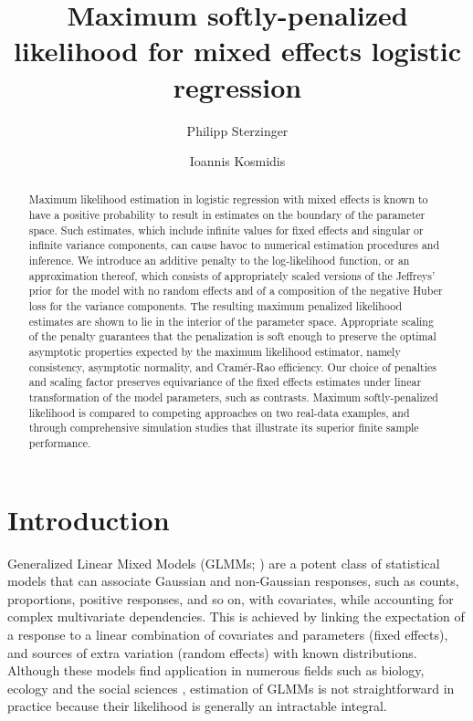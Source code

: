\documentclass[11pt, a4paper]{article}
\title{Maximum softly-penalized likelihood for mixed effects logistic regression}
\author[1]{Philipp Sterzinger}
\author[1,2]{Ioannis Kosmidis}
\affil[1]{Department of Statistics, University of Warwick, Coventry, CV4 7AL, UK}
\affil[2]{The Alan Turing Institute, London, NW1 2DB, UK}
\theoremstyle{example} \newtheorem{example}{Example}[section]
\theoremstyle{theorem} \newtheorem{theorem}{Theorem}[section]
\begin{document}
\maketitle

\begin{abstract}
Maximum likelihood estimation in logistic regression with mixed
effects is known to have a positive probability to result in
estimates on the boundary of the parameter space. Such estimates,
which include infinite values for fixed effects and singular or
infinite variance components, can cause havoc to numerical
estimation procedures and inference. We introduce an additive
penalty to the log-likelihood function, or an approximation thereof,
which consists of appropriately scaled versions of the Jeffreys'
prior for the model with no random effects and of a composition of
the negative Huber loss for the variance components. The resulting
maximum penalized likelihood estimates are shown to lie in the
interior of the parameter space. Appropriate scaling of the penalty
guarantees that the penalization is soft enough to preserve the
optimal asymptotic properties expected by the maximum likelihood
estimator, namely consistency, asymptotic normality, and
Cram\'{e}r-Rao efficiency. Our choice of penalties and scaling
factor preserves equivariance of the fixed effects estimates under
linear transformation of the model parameters, such as
contrasts. Maximum softly-penalized likelihood is compared to
competing approaches on two real-data examples, and through
comprehensive simulation studies that illustrate its superior finite
sample performance.
  \bigskip \\
\end{abstract}

\section{Introduction}
\label{sec:intro}

Generalized Linear Mixed Models (GLMMs; \citealt[Chapter
7]{mcculloch+etal:2008}) are a potent class of statistical models that
can associate Gaussian and non-Gaussian responses, such as counts,
proportions, positive responses, and so on, with covariates, while
accounting for complex multivariate dependencies. This is achieved by
linking the expectation of a response to a linear combination of
covariates and parameters (fixed effects), and sources of extra
variation (random effects) with known distributions. Although these
models find application in numerous fields such as biology, ecology
and the social sciences \citep{bolker+etal:2009}, estimation of GLMMs
is not straightforward in practice because their likelihood is
generally an intractable integral.
\end{document}
